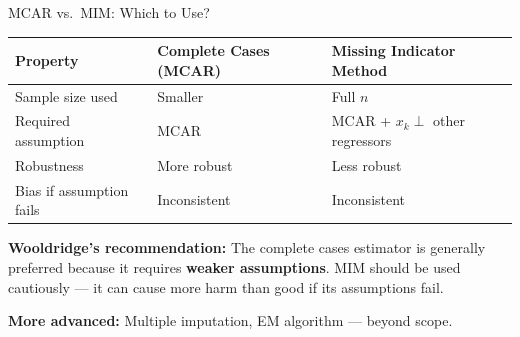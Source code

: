 \documentclass[aspectratio=169, 12pt]{beamer}
\begin{document}
\begin{frame}{MCAR vs.\ MIM: Which to Use?}

  \begin{center}\footnotesize
  \begin{tabular}{l|l|l}
  \hline
  Property & Complete Cases (MCAR) & Missing Indicator Method \\
  \hline
  Sample size used & Smaller & Full $n$ \\
  Required assumption & MCAR & MCAR + $x_k \perp$ other regressors \\
  Robustness & More robust & Less robust \\
  Bias if assumption fails & Inconsistent & Inconsistent \\
  \hline
  \end{tabular}
  \end{center}

  \begin{highlightbox}
    \textbf{Wooldridge's recommendation:} The complete cases estimator is generally preferred
    because it requires \textbf{weaker assumptions}. MIM should be used cautiously — it can
    cause more harm than good if its assumptions fail.
  \end{highlightbox}

  \textbf{More advanced:} Multiple imputation, EM algorithm — beyond scope.

\end{frame}
\end{document}

